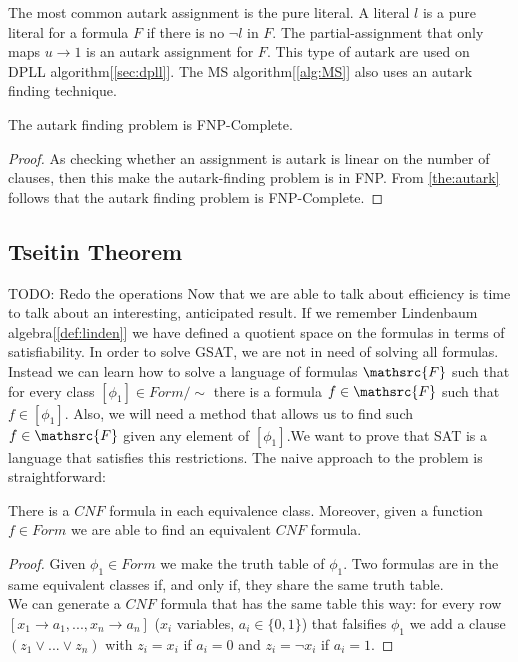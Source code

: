 The most common autark assignment is the pure literal. A literal $l$ is a pure literal for a formula $F$ if there is no $\neg l$ in $F$. The partial-assignment that only maps $u\to 1$ is an autark assignment for $F$. This type of autark are used on DPLL algorithm[\ref{sec:dpll}]. The MS algorithm[\ref{alg:MS}] also uses an autark finding technique.

\begin{corollary}
The autark finding problem is FNP-Complete.
\end{corollary}

\begin{proof}
As checking whether an assignment is autark is linear on the number of clauses, then this make the autark-finding problem is in FNP. From \ref{the:autark} follows that the autark finding problem is FNP-Complete.
\end{proof}
 


\subsection{Tseitin Theorem}
TODO: Redo the operations
Now that we are able to talk about efficiency is time to talk about an interesting, anticipated result. If we remember Lindenbaum algebra[\ref{def:linden}] we have defined a quotient space on the formulas in terms of satisfiability. In order to solve GSAT, we are not in need of solving all formulas.  Instead we can learn how to solve a language of formulas $\mathsrc{F}$ such that for every class $[\phi_1]\in Form/\sim$ there  is a formula $f\in\mathsrc{F}$ such that $f \in [\phi_1]$. Also, we will need a method that allows us to find such $f\in\mathsrc{F}$ given any element of $[\phi_1]$.We want to prove that SAT is a language that satisfies this restrictions. The naive approach to the problem is straightforward:\\

\begin{proposition}
  There is a $CNF$ formula in each equivalence class. Moreover, given a function $f\in Form$ we are able to find an equivalent $CNF$ formula.
\end{proposition}
\begin{proof}
 Given $\phi_1 \in Form$ we make the truth table of $\phi_1$. Two formulas are in the same equivalent classes if, and only if, they share the same truth table. \\

  We can generate a $CNF$ formula that has the same table this way: for every row $[x_1\to a_1,...,x_n\to a_n]$ ($x_i$ variables, $a_i\in \{0,1\}$) that falsifies $\phi_1$ we add a clause $(z_1\vee ... \vee z_n)$ with $z_i = x_i$ if $a_i = 0$ and  $z_i =\neg x_i$ if $a_i = 1$.
\end{proof}


